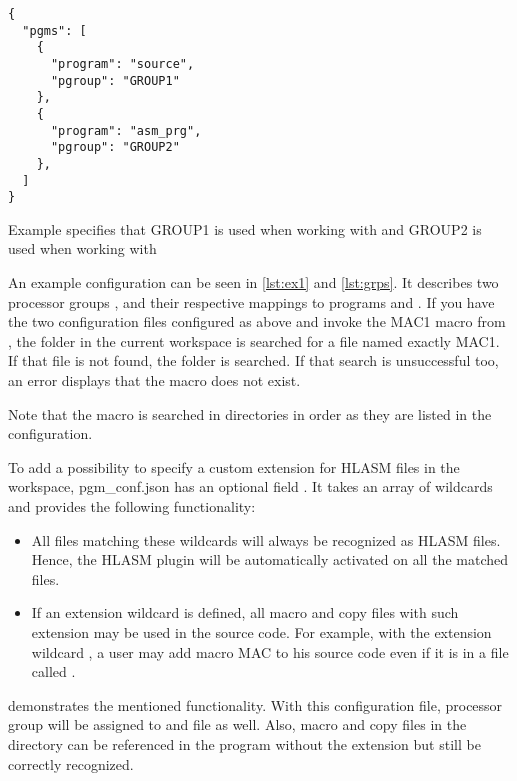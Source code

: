 \begin{listing}
	\begin{verbatim}
{
  "pgms": [
    {
      "program": "source",
      "pgroup": "GROUP1"
    },
    {
      "program": "asm_prg",
      "pgroup": "GROUP2"
    },
  ]
}
	\end{verbatim}
	\caption{Example  specifies that GROUP1 is used when working with  and GROUP2 is used when working with }
	\label{lst:grps}
\end{listing}

An example configuration can be seen in \cref{lst:ex1} and \cref{lst:grps}. It describes two processor groups ,  and their respective mappings to programs  and . If you have the two configuration files configured as above and invoke the MAC1 macro from , the folder  in the current workspace is searched for a file named exactly MAC1. If that file is not found, the folder  is searched. If that search is unsuccessful too, an error displays that the macro does not exist.

Note that the macro  is searched in directories in order as they are listed in the configuration. 

To add a possibility to specify a custom extension for HLASM files in the workspace, {pgm\_conf.json} has an optional field . It takes an array of wildcards and provides the following functionality:
\begin{itemize}
	\item All files matching these wildcards will always be recognized as HLASM files. Hence, the HLASM plugin will be automatically activated on all the matched files.
	\item If an extension wildcard is defined, all macro and copy files with such extension may be used in the source code. For example, with the extension wildcard , a user may add macro MAC to his source code even if it is in a file called .
\end{itemize}

 demonstrates the mentioned functionality. With this configuration file, processor group  will be assigned to  and  file as well. Also, macro and copy files in the  directory can be referenced in the program without the  extension  but still be correctly recognized.


